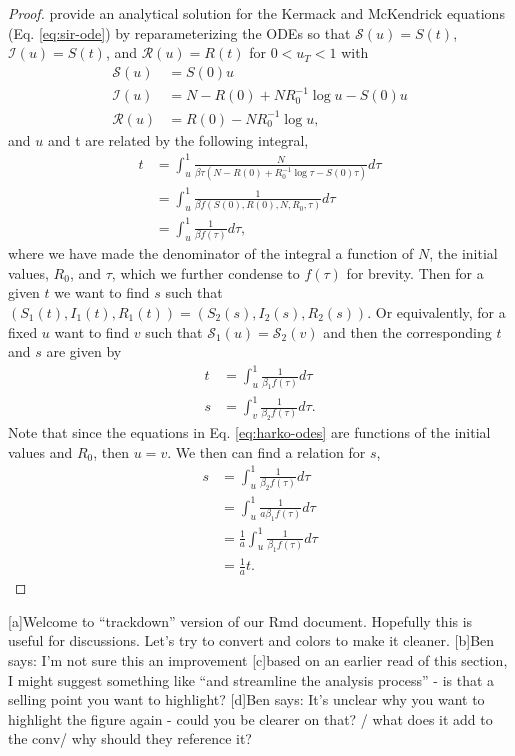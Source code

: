 \documentclass[
  shortnames]{jss}
\begin{document}
\begin{proof}\label{proof:thm}
\cite{Harko2014} provide an analytical solution for the Kermack and McKendrick equations (Eq. \eqref{eq:sir-ode}) by reparameterizing the ODEs so that $\mathcal{S}(u) = S(t)$, $\mathcal{I}(u) = S(t)$, and $\mathcal{R}(u) = R(t)$ for $0< u_T < 1$ with
\begin{align}\label{eq:harko-odes}
\mathcal{S}(u) &= S(0)u\\
\mathcal{I}(u) &= N - R(0) + NR_0^{-1}\log u - S(0)u \nonumber\\
\mathcal{R}(u) &= R(0) - NR_0^{-1} \log u, \nonumber
\end{align}
and $u$ and t are related by the following integral,
\begin{align*}
    t &= \int_{u}^1 \frac{N}{\beta \tau (N - R(0) + R_{0}^{-1} \log \tau - S(0)\tau)}d\tau \\
    &= \int_{u}^1 \frac{1}{\beta f(S(0), R(0), N, R_0, \tau)} d \tau\\
    &= \int_{u}^1 \frac{1}{\beta f(\tau)} d\tau,
\end{align*}
where we have made the denominator of the integral a function of $N$, the initial values, $R_0$, and $\tau$, which we further condense to $f(\tau)$ for brevity.
Then for a given $t$ we want to find $s$ such that $(S_1(t), I_1(t), R_1(t)) = (S_2(s), I_2(s), R_2(s))$.  Or equivalently, for a fixed $u$ want to find $v$ such that  $\mathcal{S}_1(u) = \mathcal{S}_2(v)$ and then the corresponding $t$ and $s$ are given by
\begin{align*}
    t & = \int_{u}^1 \frac{1}{\beta_1 f(\tau)} d\tau \\
    s & = \int_{v}^1 \frac{1}{\beta_2 f(\tau)} d\tau.
\end{align*}
Note that since the equations in Eq. \eqref{eq:harko-odes} are functions of the initial values and $R_0$, then $u = v$. We then can find a relation for $s$,
    \begin{align*}
    s & = \int_{u}^1 \frac{1}{\beta_2 f(\tau)} d\tau  \\
    & = \int_{u}^1 \frac{1}{a\beta_1 f(\tau)} d\tau \\ 
    &= \frac{1}{a}\int_{u}^1 \frac{1}{\beta_1 f(\tau)} d\tau \\
    &= \frac{1}{a}t.
\end{align*}
\end{proof}

{[}a{]}Welcome to ``trackdown'' version of our Rmd document. Hopefully
this is useful for discussions. Let's try to convert \sout{} and colors
to make it cleaner. {[}b{]}Ben says: I'm not sure this an improvement
{[}c{]}based on an earlier read of this section, I might suggest
something like ``and streamline the analysis process'' - is that a
selling point you want to highlight? {[}d{]}Ben says: It's unclear why
you want to highlight the figure again - could you be clearer on that? /
what does it add to the conv/ why should they reference it?


\end{document}
